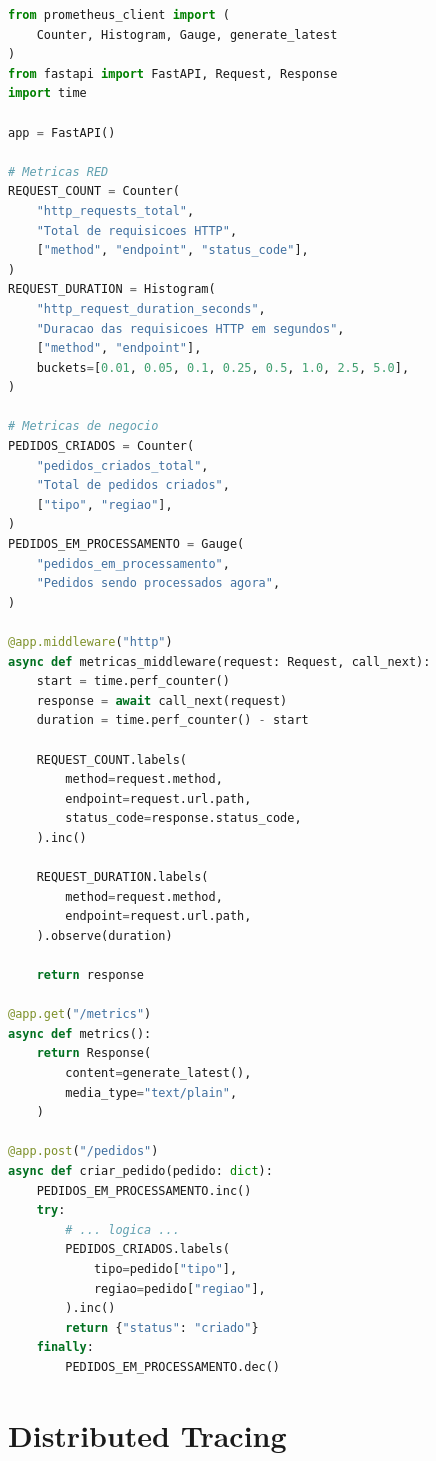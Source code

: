 \begin{lstlisting}[language=Python, caption={Métricas Prometheus em Python (FastAPI)}]
from prometheus_client import (
    Counter, Histogram, Gauge, generate_latest
)
from fastapi import FastAPI, Request, Response
import time

app = FastAPI()

# Metricas RED
REQUEST_COUNT = Counter(
    "http_requests_total",
    "Total de requisicoes HTTP",
    ["method", "endpoint", "status_code"],
)
REQUEST_DURATION = Histogram(
    "http_request_duration_seconds",
    "Duracao das requisicoes HTTP em segundos",
    ["method", "endpoint"],
    buckets=[0.01, 0.05, 0.1, 0.25, 0.5, 1.0, 2.5, 5.0],
)

# Metricas de negocio
PEDIDOS_CRIADOS = Counter(
    "pedidos_criados_total",
    "Total de pedidos criados",
    ["tipo", "regiao"],
)
PEDIDOS_EM_PROCESSAMENTO = Gauge(
    "pedidos_em_processamento",
    "Pedidos sendo processados agora",
)

@app.middleware("http")
async def metricas_middleware(request: Request, call_next):
    start = time.perf_counter()
    response = await call_next(request)
    duration = time.perf_counter() - start

    REQUEST_COUNT.labels(
        method=request.method,
        endpoint=request.url.path,
        status_code=response.status_code,
    ).inc()

    REQUEST_DURATION.labels(
        method=request.method,
        endpoint=request.url.path,
    ).observe(duration)

    return response

@app.get("/metrics")
async def metrics():
    return Response(
        content=generate_latest(),
        media_type="text/plain",
    )

@app.post("/pedidos")
async def criar_pedido(pedido: dict):
    PEDIDOS_EM_PROCESSAMENTO.inc()
    try:
        # ... logica ...
        PEDIDOS_CRIADOS.labels(
            tipo=pedido["tipo"],
            regiao=pedido["regiao"],
        ).inc()
        return {"status": "criado"}
    finally:
        PEDIDOS_EM_PROCESSAMENTO.dec()
\end{lstlisting}

\section{Distributed Tracing}

